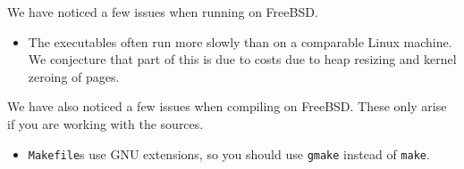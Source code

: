 
We have noticed a few issues when running {\mlton} on FreeBSD.  

\begin{itemize}

\item The executables often run more slowly than on a comparable Linux machine.
We conjecture that part of this is due to costs due to heap resizing and kernel
zeroing of pages.

\end{itemize}

We have also noticed a few issues when compiling {\mlton} on FreeBSD.  These
only arise if you are working with the {\mlton} sources.

\begin{itemize}

\item {\mlton} {\tt Makefile}s use GNU extensions, so you should use {\tt gmake}
instead of {\tt make}.

\end{itemize}
